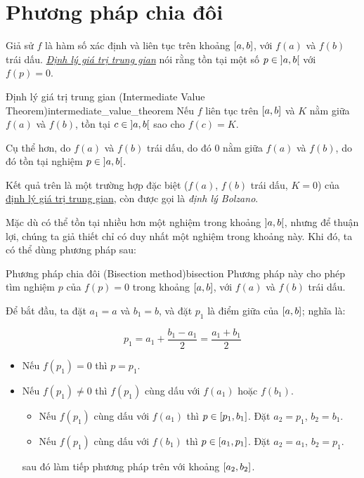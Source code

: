 \documentclass[../../Lectures]{subfiles}
\begin{document}
\section{Phương pháp chia đôi}

Giả sử \(f\) là hàm số xác định và liên tục trên khoảng \(\interval{a}{b}\), với
\(f(a)\) và \(f(b)\) trái dấu.
\emph{\hyperref[thm:intermediate_value_theorem]{Định lý giá trị trung gian}} nói
rằng tồn tại một số \(p \in \interval[open]{a}{b}\) với \(f(p) = 0\).

\begin{ctheorem}{Định lý giá trị trung gian (Intermediate Value Theorem)}{intermediate_value_theorem}
    Nếu \(f\) liên tục trên \(\interval{a}{b}\) và \(K\) nằm giữa \(f(a)\) và
    \(f(b)\), tồn tại \(c \in \interval[open]{a}{b}\) sao cho \(f(c) = K\).
\end{ctheorem}

Cụ thể hơn, do \(f(a)\) và \(f(b)\) trái dấu, do đó \(0\) nằm giữa \(f(a)\) và
\(f(b)\), do đó tồn tại nghiệm \(p \in \interval[open]{a}{b}\).

Kết quả trên là một trường hợp đặc biệt (\(f(a)\), \(f(b)\) trái dấu, \(K = 0\))
của \hyperref[thm:intermediate_value_theorem]{định lý giá trị trung gian}, còn
được gọi là \emph{định lý Bolzano}.

Mặc dù có thể tồn tại nhiều hơn một nghiệm trong khoảng
\(\interval[open]{a}{b}\), nhưng để thuận lợi, chúng ta giả thiết chỉ có duy
nhất một nghiệm trong khoảng này. Khi đó, ta có thể dùng phương pháp sau:

\begin{cmethod}{Phương pháp chia đôi (Bisection method)}{bisection}
    Phương pháp này cho phép tìm nghiệm \(p\) của \(f(p) = 0\) trong khoảng
    \(\interval{a}{b}\), với \(f(a)\) và \(f(b)\) trái dấu.

    Để bắt đầu, ta đặt \(a_1 = a\) và \(b_1 = b\), và đặt \(p_1\) là điểm giữa
    của \(\interval{a}{b}\); nghĩa là:

    \[p_1 = a_1 + \frac{b_1 - a_1}{2} = \frac{a_1 + b_1}{2}\]

    \begin{itemize}
        \item Nếu \(f(p_1) = 0\) thì \(p = p_1\).

        \item Nếu \(f(p_1) \neq 0\) thì \(f(p_1)\) cùng dấu với \(f(a_1)\) hoặc
            \(f(b_1)\).

            \begin{itemize}
                \item Nếu \(f(p_1)\) cùng dấu với \(f(a_1)\) thì \(p \in
                    \interval{p_1}{b_1}\). Đặt \(a_2 = p_1\), \(b_2 = b_1\).

                \item Nếu \(f(p_1)\) cùng dấu với \(f(b_1)\) thì \(p \in
                    \interval{a_1}{p_1}\). Đặt \(a_2 = a_1\), \(b_2 = p_1\).
            \end{itemize}
            sau đó làm tiếp phương pháp trên với khoảng \(\interval{a_2}{b_2}\).
    \end{itemize}
\end{cmethod}
\end{document}
